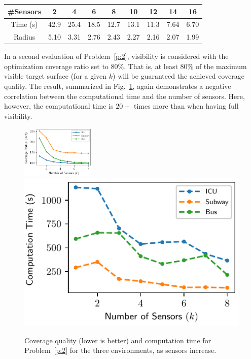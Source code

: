 \vspace{1mm}
\begin{table}[!ht]
    \centering
    \begin{tabular}{|c|c|c|c|c|c|c|c|c|}
    \hline
        \#Sensors   & 2     &  4    & 6      & 8     & 10    & 12    & 14    & 16 \\
        \hline
        Time (s)    & 42.9   &  25.4    & 18.5  & 12.7 & 13.1  & 11.3  & 7.64 & 6.70 \\ 
        \hline
        Radius  & 5.10     &  3.31    & 2.76      & 2.43     & 2.27    & 2.16    & 2.07    & 1.99 \\
        \hline
    \end{tabular}
    \label{tab:Terrain}
\end{table}

In a second evaluation of Problem~\ref{p:2}, visibility is considered with the 
optimization coverage ratio set to $80\%$. That is, at least $80\%$ of the
maximum visible target surface (for a given $k$) will be guaranteed the achieved coverage 
quality. The result, summarized in Fig.~\ref{fig:coverage-ratio-mq}, again 
demonstrates a negative correlation between the computational time and the number 
of sensors. Here, however, the computational time is $20+$ times  more 
than when having full visibility.

\begin{figure}[!ht]
    \centering
    \includegraphics[width=.46\columnwidth, height=0.98in]{chapters/surf/fig/result-radius-mq-eps-converted-to.pdf}
    \includegraphics[width=.49\columnwidth, height=1.in]{chapters/surf/fig/result-time-mq-eps-converted-to.pdf}
    \caption{Coverage quality (lower is better) and computation time for Problem~\ref{p:2}
    for the three environments, as sensors increase.}
    \label{fig:coverage-ratio-mq}
\end{figure}

